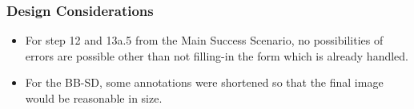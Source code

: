 \subsubsection{Design Considerations}
\begin{itemize}
    \item For step 12 and 13a.5 from the Main Success Scenario, no possibilities of errors are possible other than not filling-in the form which is already handled.
    \item For the BB-SD, some annotations were shortened so that the final image would be reasonable in size.
\end{itemize}